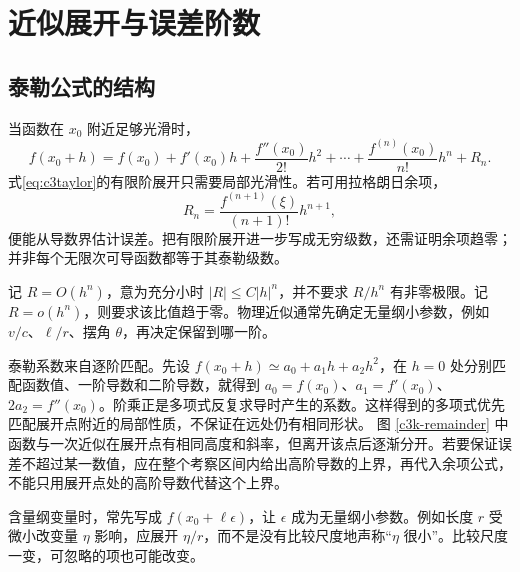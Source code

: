 \section{近似展开与误差阶数}
\subsection{泰勒公式的结构}
当函数在 $x_0$ 附近足够光滑时，
\begin{equation}\label{eq:c3taylor}
 f(x_0+h)=f(x_0)+f'(x_0)h+
 \frac{f''(x_0)}{2!}h^2+\cdots+
 \frac{f^{(n)}(x_0)}{n!}h^n+R_n.
\end{equation}
式\eqref{eq:c3taylor}的有限阶展开只需要局部光滑性。若可用拉格朗日余项，
\[
 R_n=\frac{f^{(n+1)}(\xi)}{(n+1)!}h^{n+1},
\]
便能从导数界估计误差。把有限阶展开进一步写成无穷级数，还需证明余项趋零；并非每个无限次可导函数都等于其泰勒级数。

记 $R=O(h^n)$，意为充分小时 $|R|\le C|h|^n$，并不要求 $R/h^n$ 有非零极限。记 $R=o(h^n)$，则要求该比值趋于零。物理近似通常先确定无量纲小参数，例如 $v/c$、$\ell/r$、摆角 $\theta$，再决定保留到哪一阶。

泰勒系数来自逐阶匹配。先设 $f(x_0+h)\simeq a_0+a_1h+a_2h^2$，在 $h=0$ 处分别匹配函数值、一阶导数和二阶导数，就得到 $a_0=f(x_0)$、$a_1=f'(x_0)$、$2a_2=f''(x_0)$。阶乘正是多项式反复求导时产生的系数。这样得到的多项式优先匹配展开点附近的局部性质，不保证在远处仍有相同形状。
图 \ref{c3k-remainder} 中函数与一次近似在展开点有相同高度和斜率，但离开该点后逐渐分开。若要保证误差不超过某一数值，应在整个考察区间内给出高阶导数的上界，再代入余项公式，不能只用展开点处的高阶导数代替这个上界。

含量纲变量时，常先写成 $f(x_0+\ell\epsilon)$，让 $\epsilon$ 成为无量纲小参数。例如长度 $r$ 受微小改变量 $\eta$ 影响，应展开 $\eta/r$，而不是没有比较尺度地声称“$\eta$ 很小”。比较尺度一变，可忽略的项也可能改变。

